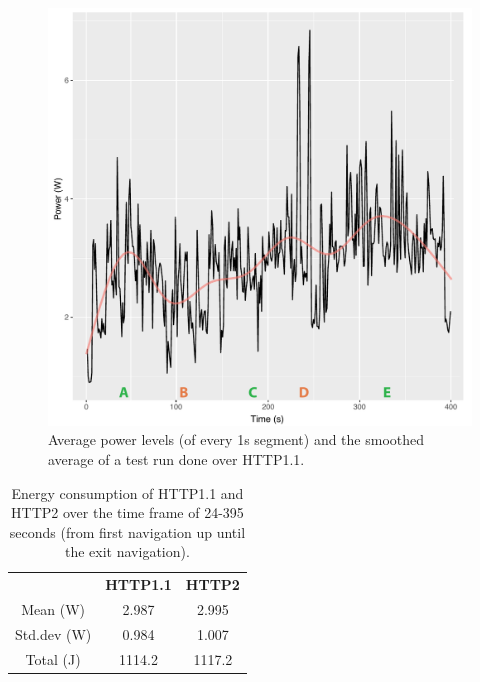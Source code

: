 \documentclass{article}
\begin{document}
\begin{figure}[t]
\centering
\includegraphics[scale=0.675]{images/average_power}
\caption{Average power levels (of every 1s segment) and the smoothed average of a test run done over HTTP1.1.}
\label{fig:average_power}
\end{figure}

\begin{table}[h!]
    \centering
    \begin{tabular}{c|c|c}
        & \textbf{HTTP1.1} & \textbf{HTTP2}  \\
        Mean (W)   & 2.987 & 2.995 \\
        Std.dev (W) & 0.984 & 1.007 \\
        Total (J)  & 1114.2 & 1117.2 \\
    \end{tabular}
    \caption{Energy consumption of HTTP1.1 and HTTP2 over the time frame of 24-395 seconds (from first navigation up until the exit navigation).}
    \label{table:energy_consumption}
\end{table}
\end{document}

